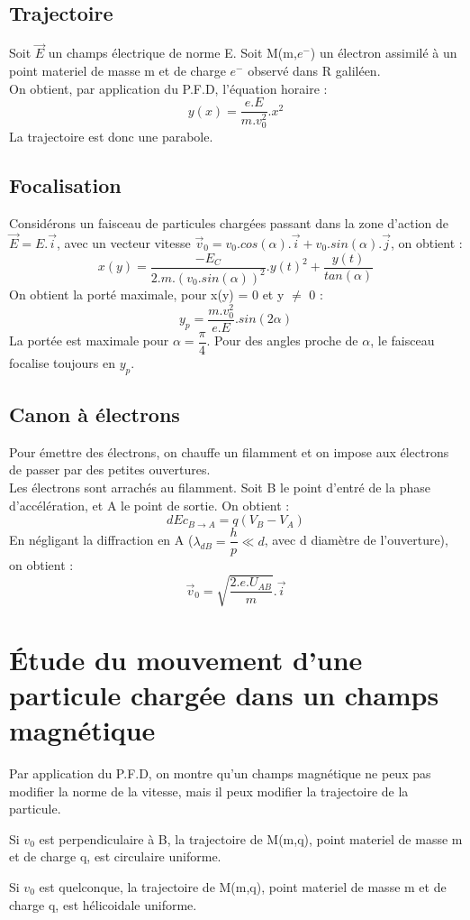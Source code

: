 \section{Trajectoire}
Soit $\overrightarrow{E}$ un champs électrique de norme E.
Soit M(m,$e^-$) un électron assimilé à un point materiel de masse m et de charge $e^-$ observé dans R galiléen.\\
On obtient, par application du P.F.D, l'équation horaire : 
$$y(x) = \dfrac{e.E}{m.v_0^2}.x^2$$
La trajectoire est donc une parabole.
\section{Focalisation}
Considérons un faisceau de particules chargées passant dans la zone d'action de $\overrightarrow{E}=E.\overrightarrow{i}$, avec un vecteur vitesse $\overrightarrow{v}_0 = v_0.cos(\alpha).\overrightarrow{i} + v_0.sin(\alpha).\overrightarrow{j}$, on obtient : 
$$x(y) = \dfrac{-E_C}{2.m.(v_0.sin(\alpha))^2}.y(t)^2 + \dfrac{y(t)}{tan(\alpha)}$$
On obtient la porté maximale, pour x(y) = 0 et y $\neq$ 0 : 
$$y_p = \dfrac{m.v_0^2}{e.E}.sin(2\alpha)$$
La portée est maximale pour $\alpha = \dfrac{\pi}{4}$. Pour des angles proche de $\alpha$, le faisceau focalise toujours en $y_p$.
\section{Canon à électrons}
\begin{de}
Pour émettre des électrons, on chauffe un filamment et on impose aux électrons de passer par des petites ouvertures.\\
Les électrons sont arrachés au filamment. Soit B le point d'entré de la phase d'accélération, et A le point de sortie. On obtient : 
$$dEc_{B\rightarrow A} = q(V_B-V_A)$$
En négligant la diffraction en A ($\lambda_{dB} = \dfrac{h}{p} \ll d$, avec d diamètre de l'ouverture), on obtient : 
$$\overrightarrow{v}_0 = \sqrt{\dfrac{2.e.U_{AB}}{m}}.\overrightarrow{i}$$
\end{de}
\chapter{Étude du mouvement d'une particule chargée dans un champs magnétique}
\begin{prop}
Par application du P.F.D, on montre qu'un champs magnétique ne peux pas modifier la norme de la vitesse, mais il peux modifier la trajectoire de la particule.
\end{prop}
\begin{prop}
Si $v_0$ est perpendiculaire à B, la trajectoire de M(m,q), point materiel de masse m et de charge q, est circulaire uniforme.
\end{prop}
\begin{prop}
Si $v_0$ est quelconque, la trajectoire de M(m,q), point materiel de masse m et de charge q, est hélicoidale uniforme.
\end{prop}
